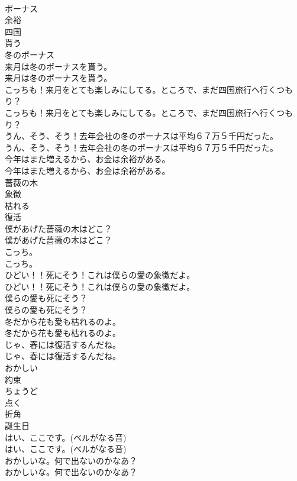 \documentclass[8pt]{extreport}
\begin{document}
\begin{CJK}{UTF8}{min}
\\	ボーナス
\\	余裕
\\	四国
\\	貰う
\\	冬のボーナス
\\	来月は冬のボーナスを貰う。	
\\	来月は冬のボーナスを貰う。 
\\	こっちも！来月をとても楽しみにしてる。ところで、まだ四国旅行へ行くつもり？	
\\	こっちも！来月をとても楽しみにしてる。ところで、まだ四国旅行へ行くつもり？ 
\\	うん、そう、そう！去年会社の冬のボーナスは平均６７万５千円だった。	
\\	うん、そう、そう！去年会社の冬のボーナスは平均６７万５千円だった。 
\\	今年はまた増えるから、お金は余裕がある。	
\\	今年はまた増えるから、お金は余裕がある。 
\\	薔薇の木
\\	象徴
\\	枯れる
\\	復活
\\	僕があげた薔薇の木はどこ？	
\\	僕があげた薔薇の木はどこ？ 
\\	こっち。	
\\	こっち。 
\\	ひどい！！死にそう！これは僕らの愛の象徴だよ。	
\\	ひどい！！死にそう！これは僕らの愛の象徴だよ。 
\\	僕らの愛も死にそう？	
\\	僕らの愛も死にそう？ 
\\	冬だから花も愛も枯れるのよ。	
\\	冬だから花も愛も枯れるのよ。 
\\	じゃ、春には復活するんだね。	
\\	じゃ、春には復活するんだね。 
\\	おかしい
\\	約束
\\	ちょうど
\\	点く
\\	折角
\\	誕生日
\\	はい、ここです。(ベルがなる音)	
\\	はい、ここです。(ベルがなる音) 
\\	おかしいな。何で出ないのかなあ？	
\\	おかしいな。何で出ないのかなあ？ 

\end{CJK}
\end{document}
